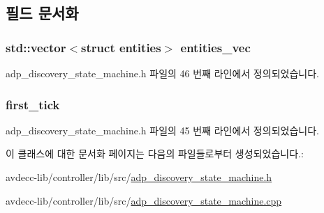 \subsection{필드 문서화}
\subsubsection[{\texorpdfstring{entities\+\_\+vec}{entities_vec}}]{\setlength{\rightskip}{0pt plus 5cm}std\+::vector$<$struct {\bf entities}$>$ entities\+\_\+vec\hspace{0.3cm}{\ttfamily [private]}}\hypertarget{classavdecc__lib_1_1adp__discovery__state__machine_a1a3e2aa0e465f64d8e1e03f7a11556e5}{}\label{classavdecc__lib_1_1adp__discovery__state__machine_a1a3e2aa0e465f64d8e1e03f7a11556e5}


adp\+\_\+discovery\+\_\+state\+\_\+machine.\+h 파일의 46 번째 라인에서 정의되었습니다.

\subsubsection[{\texorpdfstring{first\+\_\+tick}{first_tick}}]{ first\+\_\+tick\hspace{0.3cm}{\ttfamily [private]}}\hypertarget{classavdecc__lib_1_1adp__discovery__state__machine_add99975cd88f74770a569395b2633589}{}\label{classavdecc__lib_1_1adp__discovery__state__machine_add99975cd88f74770a569395b2633589}


adp\+\_\+discovery\+\_\+state\+\_\+machine.\+h 파일의 45 번째 라인에서 정의되었습니다.



이 클래스에 대한 문서화 페이지는 다음의 파일들로부터 생성되었습니다.\+:\begin{DoxyCompactItemize}
\item 
avdecc-\/lib/controller/lib/src/\hyperlink{adp__discovery__state__machine_8h}{adp\+\_\+discovery\+\_\+state\+\_\+machine.\+h}\item 
avdecc-\/lib/controller/lib/src/\hyperlink{adp__discovery__state__machine_8cpp}{adp\+\_\+discovery\+\_\+state\+\_\+machine.\+cpp}\end{DoxyCompactItemize}

